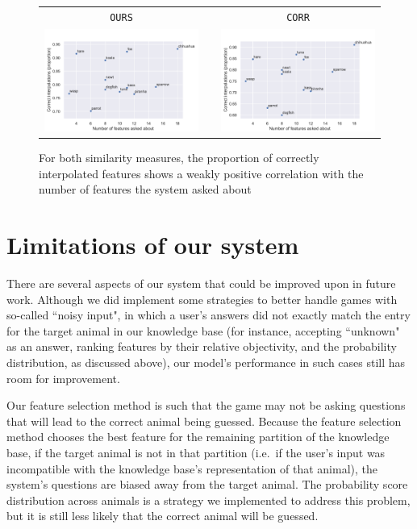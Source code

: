 \documentclass[11pt,a4paper]{article}
\begin{document}
\begin{figure}
\centering
\begin{tabular}{@{}ccc}
\texttt{OURS} && \texttt{CORR} \\
\includegraphics[trim=0 0 0 30,clip,width=.48\linewidth]{graphics/interpolation-eval-ours.pdf} && 
\includegraphics[trim=0 0 0 30,clip,width=.48\linewidth]{graphics/interpolation-eval-corr.pdf} \\
\end{tabular}
	\caption{For both similarity measures, the proportion of correctly interpolated features shows a weakly positive correlation with the number of features the system asked about}
	\label{fig:interp-eval}
\end{figure}

\section{Limitations of our system}
\label{sec:limit}

There are several aspects of our system that could be improved upon in future work. 
Although we did implement some strategies to better handle games with so-called ``noisy input", in which a user's answers did not exactly match the entry for the target animal in our knowledge base (for instance, accepting ``unknown" as an answer, ranking features by their relative objectivity, and the probability distribution, as discussed above), our model's performance in such cases still has room for improvement. 

Our feature selection method is such that the game may not be asking questions that will lead to the correct animal being guessed. 
Because the feature selection method chooses the best feature for the remaining partition of the knowledge base, if the target animal is not in that partition (i.e.\ if the user's input was incompatible with the knowledge base's representation of that animal), the system's questions are biased away from the target animal. 
The probability score distribution across animals is a strategy we implemented to address this problem, but it is still less likely that the correct animal will be guessed.
\end{document}
